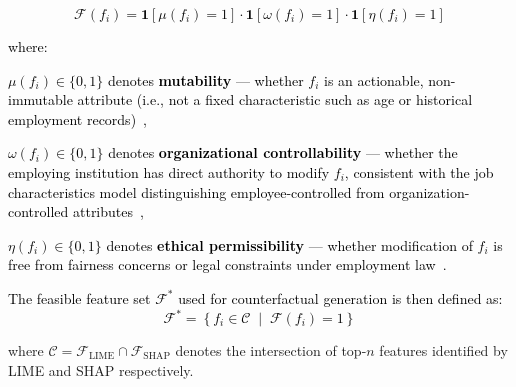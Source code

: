 \documentclass[a4paper,fleqn]{cas-sc}
\begin{document}
\textcolor{black}{\begin{equation}
    \mathcal{F}(f_i) = \mathbf{1}\left[\mu(f_i) = 1\right] \cdot 
    \mathbf{1}\left[\omega(f_i) = 1\right] \cdot 
    \mathbf{1}\left[\eta(f_i) = 1\right]
\end{equation}}


\textcolor{black}{\noindent where:}
\begin{itemize}
    \item \textcolor{black}{$\mu(f_i) \in \{0,1\}$ denotes \textbf{mutability} — whether $f_i$ is an actionable, non-immutable attribute (i.e., not a fixed characteristic such as age or historical employment records)~\cite{wachter2017counterfactual},}

    \textcolor{black}{\item $\omega(f_i) \in \{0,1\}$ denotes \textbf{organizational controllability} — whether the employing institution has direct authority to modify $f_i$, consistent with the job characteristics model distinguishing employee-controlled from organization-controlled attributes~\cite{hackman1976motivation},}

    \textcolor{black}{\item $\eta(f_i) \in \{0,1\}$ denotes \textbf{ethical permissibility} — whether modification of $f_i$ is free from fairness concerns or legal constraints under employment law~\cite{barocas2023fairness}.}
\end{itemize}

\textcolor{black}{\noindent The feasible feature set $\mathcal{F}^*$ used for counterfactual generation is then defined as:}
\textcolor{black}{\begin{equation}
    \mathcal{F}^* = \left\{ f_i \in \mathcal{C} \;\middle|\; 
    \mathcal{F}(f_i) = 1 \right\}
\end{equation}}

\noindent where $\mathcal{C} = \mathcal{F}_{\text{LIME}} \cap 
\mathcal{F}_{\text{SHAP}}$ denotes the intersection of top-$n$ features identified by LIME and SHAP respectively.\\
\end{document}
